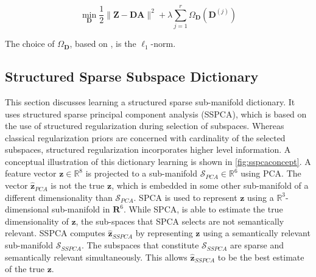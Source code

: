 \begin{equation}
 \min_{\mathbf{D}} \frac{1}{2} \parallel \mathbf{Z} - \mathbf{D} \mathbf{A} \parallel^{2} + \lambda \sum_{j=1}^{r} \Omega_{\mathbf{D}}(\mathbf{D}^{(j)})
\end{equation}

The choice of $\Omega_{\mathbf{D}}$, based on \citep{Lee2007}, is the $\ell_{1}$-norm. 

\subsection[Structured Sparse Subspace Dictionary]{Structured Sparse Subspace Dictionary}
\label{ch_groupsparse_subsec_structmultimanifolddict}

This section discusses learning a structured sparse sub-manifold dictionary. It uses structured sparse principal component analysis (SSPCA), which is based on the use of structured regularization during selection of subspaces. Whereas classical regularization priors are concerned with cardinality of the selected subspaces, structured regularization incorporates higher level information. A conceptual illustration of this dictionary learning is shown in \cref{fig:sspcaconcept}. A feature vector $\mathbf{z} \in \mathds{R}^{8}$ is projected to a sub-manifold $\mathcal{S}_{PCA} \in \mathds{R}^{6}$ using PCA. The vector $\hat{\mathbf{z}}_{PCA}$ is not the true $\mathbf{z}$, which is embedded in some other sub-manifold of a different dimensionality than $\mathcal{S}_{PCA}$. SPCA is used to represent $\mathbf{z}$ using a $\mathds{R}^{3}$-dimensional sub-manifold in $\mathbf{R}^{6}$. While SPCA, is able to estimate the true dimensionality of $\mathbf{z}$, the sub-spaces that SPCA selects are not semantically relevant. SSPCA computes $\hat{\mathbf{z}}_{SSPCA}$ by representing $\mathbf{z}$ using a semantically relevant sub-manifold $\mathcal{S}_{SSPCA}$. The subspaces that constitute $\mathcal{S}_{SSPCA}$ are sparse and semantically relevant simultaneously. This allows $\hat{\mathbf{z}}_{SSPCA}$ to be the best estimate of the true $\mathbf{z}$.

